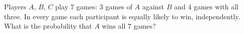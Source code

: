 Players $A$, $B$, $C$ play $7$ games: $3$ games of $A$ against $B$ and $4$ games with all three. In every game each participant is equally likely to win, independently. What is the probability that $A$ wins all $7$ games?
